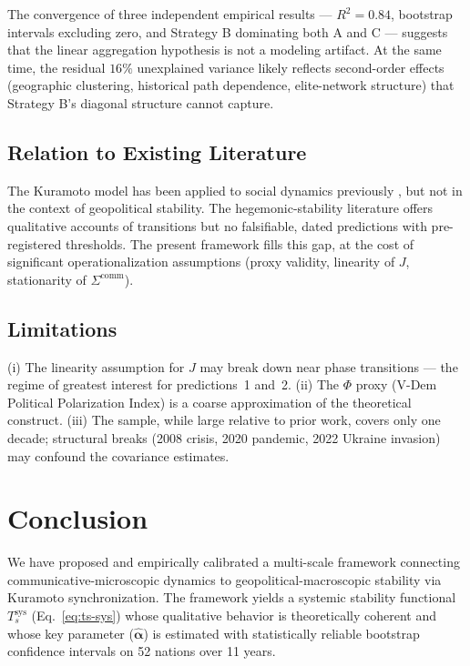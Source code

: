 \documentclass[12pt]{article}
\theoremstyle{plain}
\theoremstyle{definition}
\theoremstyle{remark}
\begin{document}
The convergence of three independent empirical results --- $R^2 = 0.84$, bootstrap intervals excluding zero, and Strategy B dominating both A and C --- suggests that the linear aggregation hypothesis is not a modeling artifact. At the same time, the residual $16\%$ unexplained variance likely reflects second-order effects (geographic clustering, historical path dependence, elite-network structure) that Strategy B's diagonal structure cannot capture.

\subsection{Relation to Existing Literature}

The Kuramoto model has been applied to social dynamics previously \citep{pluchino2006}, but not in the context of geopolitical stability. The hegemonic-stability literature \citep{gilpin1981,arrighi1994} offers qualitative accounts of transitions but no falsifiable, dated predictions with pre-registered thresholds. The present framework fills this gap, at the cost of significant operationalization assumptions (proxy validity, linearity of $J$, stationarity of $\Sigma^{\text{comm}}$).

\subsection{Limitations}

(i) The linearity assumption for $J$ may break down near phase transitions --- the regime of greatest interest for predictions~1 and~2. (ii) The $\Phi$ proxy (V-Dem Political Polarization Index) is a coarse approximation of the theoretical construct. (iii) The sample, while large relative to prior work, covers only one decade; structural breaks (2008 crisis, 2020 pandemic, 2022 Ukraine invasion) may confound the covariance estimates.

\section{Conclusion}

We have proposed and empirically calibrated a multi-scale framework connecting communicative-microscopic dynamics to geopolitical-macroscopic stability via Kuramoto synchronization. The framework yields a systemic stability functional $T_s^{\text{sys}}$ (Eq.~\eqref{eq:ts-sys}) whose qualitative behavior is theoretically coherent and whose key parameter ($\hat{\boldsymbol\alpha}$) is estimated with statistically reliable bootstrap confidence intervals on 52 nations over 11 years.
\end{document}
